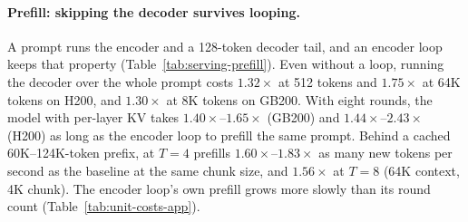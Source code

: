 \paragraph{Prefill: skipping the decoder survives looping.}
A \ced prompt runs the encoder and a 128-token decoder tail, and an encoder loop keeps that property
(Table~\ref{tab:serving-prefill}). Even without a loop, running the decoder over the whole prompt costs $1.32\times$ at
512 tokens and $1.75\times$ at 64K tokens on H200, and $1.30\times$ at 8K tokens on GB200. With eight rounds, the
model with per-layer KV takes $1.40\times$--$1.65\times$ (GB200) and $1.44\times$--$2.43\times$ (H200) as long as the
\ced encoder loop to prefill the same prompt. Behind a cached 60K--124K-token prefix, \ourmethod at $T=4$ prefills
$1.60\times$--$1.83\times$ as many new tokens per second as the baseline at the same chunk size, and $1.56\times$ at
$T=8$ (64K context, 4K chunk). The encoder loop's own prefill grows more slowly than its round count
(Table~\ref{tab:unit-costs-app}).

